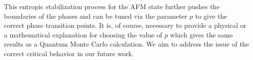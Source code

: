 \documentclass[../thesis_main.tex]{subfiles}
\begin{document}
\FloatBarrier \!\!\!\!\!\!\!\!\!\!\!
This entropic stabilization process for the AFM state further pushes the boundaries of the phases and can be tuned via the parameter $p$ to give the correct phase transition points. It is, of course, necessary to provide a physical or a mathematical explanation for choosing the value of $p$ which gives the same results as a Quantum Monte Carlo calculation. We aim to address the issue of the correct critical behavior in our future work.  
\end{document}
